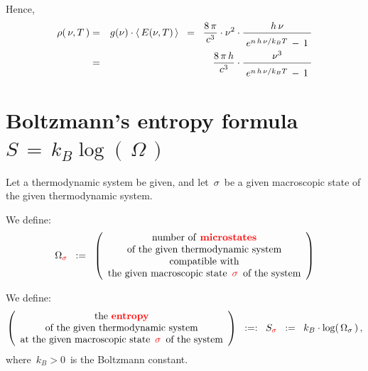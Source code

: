 Hence,
\begin{eqnarray*}
\rho(\,\nu,T\,)
& = &
    g(\nu)
    \cdot
    \langle\,E(\nu,T)\,\rangle
\;\; = \;\;
    \dfrac{
        8\,\pi
        }{
        c^{3}
        }
    \cdot
    \nu^{2}
    \cdot
    \dfrac{
        h\,\nu
        }{
        {\color{white}.}
        \overset{{\color{white}.}}{
            e^{n\,h\,\nu /k_{B}T} \, - \, 1
            }
        {\color{white}.}
        }
\\
& = &
    \dfrac{
        8\,\pi\,h
        }{
        c^{3}
        }
    \cdot
    \dfrac{
        \nu^{3}
        }{
        {\color{white}.}
        \overset{{\color{white}.}}{
            e^{n\,h\,\nu /k_{B}T} \, - \, 1
            }
        {\color{white}.}
        }
\end{eqnarray*}


\vskip 0.5cm
\section{Boltzmann's entropy formula \,$S \,=\, k_{B}\log\!\left(\,\Omega\,\right)$}


Let a thermodynamic system be given, and
let \,$\sigma$\, be a given macroscopic state of the given thermodynamic system.

\vskip 0.4cm
\noindent
We define:
\begin{equation*}
\Omega_{{\color{red}\sigma}}
\;\; := \;\;
    \left(\begin{array}{c}
        \textnormal{number of \textbf{\color{red}microstates}}
        \\
        \textnormal{of the given thermodynamic system}
        \\
        \textnormal{compatible with}
        \\
        \textnormal{the given macroscopic state \,${\color{red}\sigma}$\, of the system}
        \end{array}\right)
\end{equation*}

\vskip 0.4cm
\noindent
We define:
\begin{equation*}
\left(\begin{array}{c}
    \textnormal{the \textbf{\color{red}entropy}}
    \\
    \textnormal{of the given thermodynamic system}
    \\
    \textnormal{at the given macroscopic state \,${\color{red}\sigma}$\, of the system}
    \end{array}\right)
\;\; :=: \;\;
    S_{{\color{red}\sigma}}
\;\; := \;\;
    k_{B}\cdot\log\!\left(\,\Omega_{\sigma}\,\right),
\end{equation*}
where
\,$k_{B} > 0$\,
is the Boltzmann constant.

